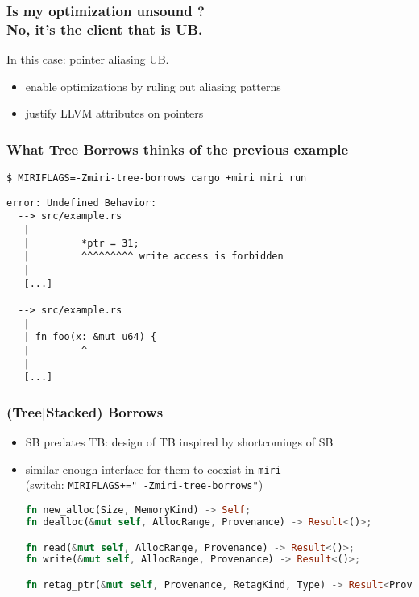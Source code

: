 \begin{frame}
    \frametitle{Is my optimization unsound ?\\No, it's the client that is UB.}
    In this case: pointer aliasing UB.

    \begin{itemize}
        \item enable optimizations by ruling out aliasing patterns
        \item justify LLVM attributes on pointers
    \end{itemize}
\end{frame}

\begin{frame}[fragile]
    \frametitle{What Tree Borrows thinks of the previous example}
    \texttt{\$ MIRIFLAGS=-Zmiri-tree-borrows cargo +miri miri run}
        \begin{lstlisting}
error: Undefined Behavior:
  --> src/example.rs
   |
   |         *ptr = 31;
   |         ^^^^^^^^^ write access is forbidden
   |
   [...]

  --> src/example.rs
   |
   | fn foo(x: &mut u64) {
   |         ^
   |
   [...]
        \end{lstlisting}
\end{frame}

\begin{frame}[fragile]
    \frametitle{(Tree|Stacked) Borrows}
    \begin{itemize}
        \item SB predates TB: design of TB inspired by shortcomings of SB
        \item similar enough interface for them to coexist in \texttt{miri}\\
            (switch: \texttt{MIRIFLAGS+=" -Zmiri-tree-borrows"})
            \begin{minipage}{0.9\textwidth}
            \begin{block}{}
                \begin{lstlisting}[language=rust, basicstyle=\ttfamily\fontsize{7}{8}\selectfont]
fn new_alloc(Size, MemoryKind) -> Self;
fn dealloc(&mut self, AllocRange, Provenance) -> Result<()>;

fn read(&mut self, AllocRange, Provenance) -> Result<()>;
fn write(&mut self, AllocRange, Provenance) -> Result<()>;

fn retag_ptr(&mut self, Provenance, RetagKind, Type) -> Result<Provenance>;
                \end{lstlisting}
            \end{block}
            \end{minipage}
    \end{itemize}
\end{frame}


